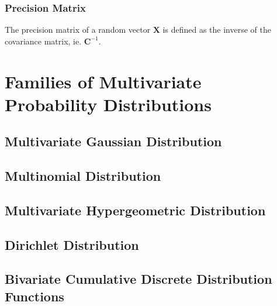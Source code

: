 \documentclass[11pt]{report} %
\begin{document}
\subsubsection{Precision Matrix}

The precision matrix of a random vector $\mathbf{X}$ is defined as the inverse of the covariance matrix, ie. $\mathbf{C}^{-1}$.

\section{Families of Multivariate Probability Distributions}

\subsection{Multivariate Gaussian Distribution}

\subsection{Multinomial Distribution}

\subsection{Multivariate Hypergeometric Distribution}

\subsection{Dirichlet Distribution}

\subsection{Bivariate Cumulative Discrete Distribution Functions}
\end{document}
